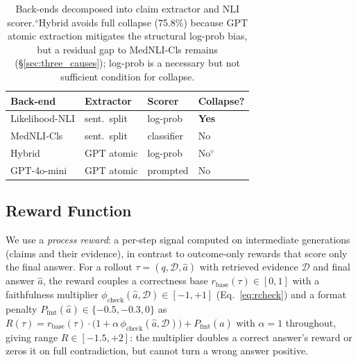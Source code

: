 \documentclass[11pt]{article}
\begin{document}
\begin{table}[t]
\centering\small
\setlength{\tabcolsep}{3pt}
\begin{tabular}{@{}llll@{}}
\toprule
\textbf{Back-end} & \textbf{Extractor} & \textbf{Scorer} & \textbf{Collapse?} \\
\midrule
Likelihood-NLI & sent.\ split & log-prob    & \textbf{Yes} \\
MedNLI-Cls  & sent.\ split & classifier  & No \\

Hybrid  & GPT atomic   & log-prob    & No$^{\diamond}$ \\
GPT-4o-mini        & GPT atomic   & prompted    & No \\
\bottomrule

\end{tabular}
\caption{Back-ends decomposed into claim extractor 
and NLI scorer.$^{\diamond}$Hybrid avoids full collapse (75.8\%) because GPT atomic extraction mitigates the structural log-prob bias, but a residual gap to MedNLI-Cls remains (\S\ref{sec:three_causes}); log-prob is a necessary but not sufficient condition for collapse.}
\label{tab:backends}
\end{table}



\subsection{Reward Function}
\label{sec:reward}
We use a \emph{process reward}: a per-step signal computed on intermediate generations (claims and their evidence), in contrast to outcome-only rewards that score only the final answer.
For a rollout $\tau=(q,\mathcal{D},\hat{a})$ with
retrieved evidence $\mathcal{D}$ and final answer
$\hat{a}$, the reward couples a correctness base
$r_{\text{base}}(\tau)\!\in\![0, 1]$ with a faithfulness
multiplier
$\phi_{\text{check}}(\hat{a}, \mathcal{D})\!\in\![-1, +1]$
(Eq.~\ref{eq:rcheck}) and a format penalty
$P_{\text{fmt}}(\hat{a})\!\in\!\{-0.5, -0.3, 0\}$ as
$R(\tau) = r_{\text{base}}(\tau)\cdot\bigl(1+\alpha\,\phi_{\text{check}}(\hat{a},\mathcal{D})\bigr) + P_{\text{fmt}}(\hat{a})$
with $\alpha=1$ throughout, giving range
$R\!\in\![-1.5,+2]$: the multiplier doubles a correct
answer's reward or zeros it on full contradiction, but
cannot turn a wrong answer positive.
\end{document}

